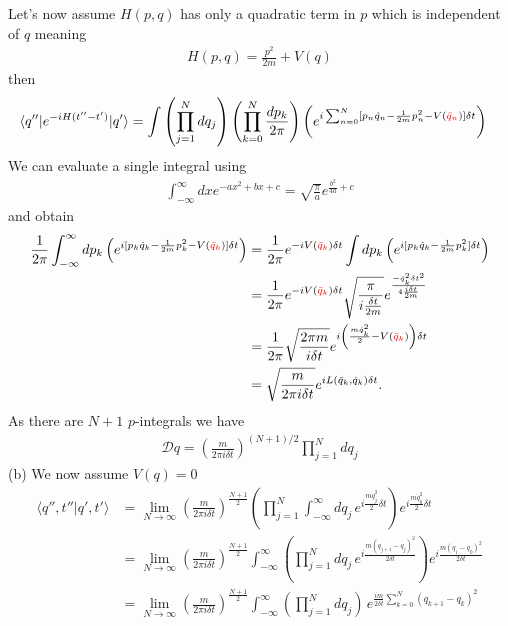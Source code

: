 \documentclass[10pt,a4paper]{article}
\theoremstyle{definition}
\begin{document}
Let's now assume $H(p,q)$ has only a quadratic term in $p$ which is independent of $q$ meaning
\begin{align}
    H(p,q)=\frac{p^2}{2m}+V(q)
\end{align}
then
\begin{align}
\langle q''|e^{-iH(t''-t')}|q'\rangle
        &=\int\left(\prod_{j=1}^N dq_j\right)\left(\prod_{k=0}^{N}\frac{dp_k}{2\pi}\right) \left(e^{i\sum_{n=0}^N[p_n\dot{q}_n-\frac{1}{2m}p_n^2-V(\textcolor{red}{\bar{q}_n})]\delta t}\right)
\end{align}
We can evaluate a single integral using
\begin{align}
    \int_{-\infty}^\infty dx e^{-ax^2+bx+c}=\sqrt{\frac{\pi}{a}}e^{\frac{b^2}{4a}+c}
\end{align}
and obtain
\begin{align}
        \frac{1}{2\pi}\int_{-\infty}^\infty dp_k \left(e^{i[p_k\dot{q}_k-\frac{1}{2m}p_k^2-V(\textcolor{red}{\bar{q}_k})]\delta t}\right)
        &=\frac{1}{2\pi}e^{-iV(\textcolor{red}{\bar{q}_k})\delta t}\int dp_k \left(e^{i[p_k\dot{q}_k-\frac{1}{2m}p_k^2]\delta t}\right)\\
        &=\frac{1}{2\pi}e^{-iV(\textcolor{red}{\bar{q}_k})\delta t}\sqrt{\frac{\pi}{i\frac{\delta t}{2m}}} e^{\frac{-\dot{q}_k^2\delta t^2}{4\frac{i\delta t}{2m}}}\\
        &=\frac{1}{2\pi}\sqrt{\frac{2\pi m}{i\delta t}} e^{i\left(\frac{m\dot{q}_k^2}{2}-V(\textcolor{red}{\bar{q}_k})\right)\delta t}\\
        &=\sqrt{\frac{m}{2\pi i\delta t}} e^{iL(\bar{q}_k,\dot{q}_k)\delta t}.
\end{align}
As there are $N+1$ $p$-integrals we have
\begin{align}
    \mathcal{D}q=\left(\frac{m}{2\pi i\delta t}\right)^{(N+1)/2}\prod_{j=1}^N dq_j
\end{align}
(b) We now assume $V(q)=0$
\begin{align}
    \langle q'',t''|q',t'\rangle
    &=\lim_{N\rightarrow\infty}\left(\frac{m}{2\pi i\delta t}\right)^\frac{N+1}{2}\left(\prod_{j=1}^N \int_{-\infty}^{\infty}dq_j\, e^{i\frac{m\dot{q}_j^2}{2}\delta t}\right)e^{i\frac{m\dot{q}_0^2}{2}\delta t}\\
    &=\lim_{N\rightarrow\infty}\left(\frac{m}{2\pi i\delta t}\right)^\frac{N+1}{2}\int_{-\infty}^{\infty}\left(\prod_{j=1}^N dq_j\, e^{i\frac{m(q_{j+1}-q_j)^2}{2\delta t}}\right)e^{i\frac{m(q_1-q_0)^2}{2\delta t}}\\
    &=\lim_{N\rightarrow\infty}\left(\frac{m}{2\pi i\delta t}\right)^\frac{N+1}{2}\int_{-\infty}^{\infty}\left(\prod_{j=1}^N dq_j\right)\,e^{\frac{im}{2\delta t}\sum_{k=0}^N(q_{k+1}-q_k)^2}
\end{align}
\end{document}
